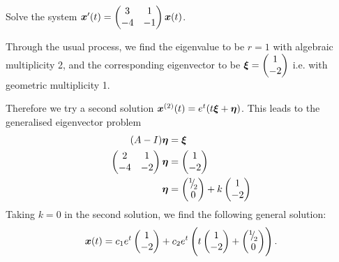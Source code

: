 \begin{eg}
	Solve the system $\bm{x}'(t) = \begin{pmatrix}3 & 1 \\ -4 & -1\end{pmatrix}\bm{x}(t)$.
	
	Through the usual process, we find the eigenvalue to be $r=1$ with algebraic multiplicity 2, and the corresponding eigenvector to be $\bm{\xi} = \begin{pmatrix}1 \\ -2\end{pmatrix}$ i.e. with geometric multiplicity 1.
	
	Therefore we try a second solution $\bm{x}^{(2)}(t) = e^t(t\bm{\xi} + \bm{\eta})$. This leads to the generalised eigenvector problem
	\begin{align*}
		(A-I)\bm{\eta} &= \bm{\xi} \\
		\begin{pmatrix}2 & 1 \\ -4 & -2\end{pmatrix}\bm{\eta} &= \begin{pmatrix}1 \\ -2\end{pmatrix} \\
		\bm{\eta} &= \begin{pmatrix}{}^{1}{\mskip -5mu/\mskip -3mu}_{2} \\ 0\end{pmatrix} + k\begin{pmatrix}1 \\ -2\end{pmatrix}
	\end{align*}
	Taking $k=0$ in the second solution, we find the following general solution:
	\[
	\bm{x}(t) = c_1 e^t \begin{pmatrix}1 \\ -2\end{pmatrix} + c_2 e^t \left(t\begin{pmatrix}1 \\ -2\end{pmatrix} + \begin{pmatrix}{}^{1}{\mskip -5mu/\mskip -3mu}_{2} \\ 0\end{pmatrix}\right).
	\]
\end{eg}

